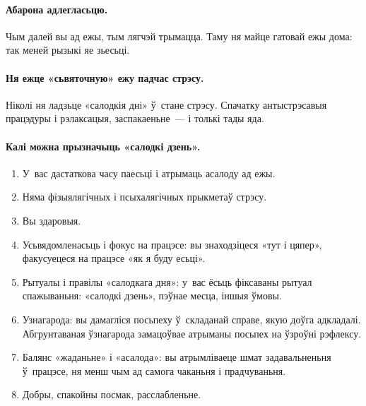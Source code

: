 
\paragraph{Абарона адлегласьцю.}
Чым далей вы ад ежы, тым лягчэй трымацца. Таму ня майце гатовай ежы дома: так меней рызыкі яе зьесьці.

\paragraph{Ня ежце «сьвяточную» ежу падчас стрэсу.}
Ніколі ня ладзьце «салодкія дні» ў~стане стрэсу. Спачатку антыстрэсавыя працэдуры і рэлаксацыя, заспакаеньне~--- і толькі тады яда.

\paragraph{Калі можна прызначыць «салодкі дзень».}
\begin{enumerate}
  \item У~вас дастаткова часу паесьці і атрымаць асалоду ад ежы.
  \item Няма фізыялягічных і псыхалягічных прыкметаў стрэсу.
  \item Вы здаровыя.
  \item Усьвядомленасьць і фокус на працэсе: вы знаходзіцеся «тут і цяпер», факусуецеся на працэсе «як я буду есьці».
  \item Рытуалы і правілы «салодкага дня»: у~вас ёсьць фіксаваны рытуал спажываньня: «салодкі дзень», пэўнае месца, іншыя ўмовы.
  \item Узнагарода: вы дамагліся посьпеху ў~складанай справе, якую доўга адкладалі. Абгрунтаваная ўзнагарода замацоўвае атрыманы посьпех на ўзроўні рэфлексу.
  \item Балянс «жаданьне» і «асалода»: вы атрымліваеце шмат задавальненьня ў~працэсе, ня менш чым ад самога чаканьня і прадчуваньня.
  \item Добры, спакойны посмак, расслабленьне.
\end{enumerate}

